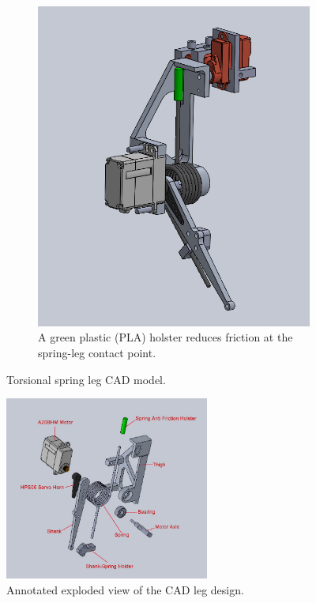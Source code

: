 \begin{figure}[h!]
\begin{subfigure}[b]{0.45\textwidth}
        \includegraphics[width=\textwidth]{Images/CAD_leg_outside_bent.png}
        \caption{A green plastic (PLA) holster reduces friction at the spring-leg contact point.}
        \label{fig:image2}
    \end{subfigure}
    \caption{Torsional spring leg CAD model.}
    \label{fig:assembly_CAD}
\end{figure}

\begin{figure}[h!]
    \centering
    \includegraphics[width=0.6\textwidth]{Images/CAD_leg_exploded_annotate.png}
    \caption{Annotated exploded view of the CAD leg design.}
    \label{fig:CAD_leg_exploded_annotate}
\end{figure}

